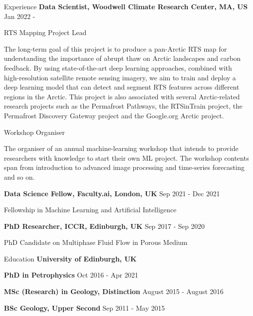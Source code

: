 \documentclass{resume} %
\newenvironment{indentpar}[1]%
  {\begin{list}{}%
          {\setlength{\leftmargin}{#1}}%
          \item[]%
  }
  {\end{list}}
\begin{document}
\begin{rSection}{Experience}
{\bf Data Scientist, Woodwell Climate Research Center, MA, US} \hfill {Jan 2022 - } 

\begin{indentpar} {0.5cm} RTS Mapping Project Lead
\end{indentpar}
\begin{indentpar} {1cm} 
The long-term goal of this project is to produce a pan-Arctic RTS map for understanding the importance of abrupt thaw on Arctic landscapes and carbon feedback. By using state-of-the-art deep learning approaches, combined with high-resolution satellite remote sensing imagery, we aim to train and deploy a deep learning model that can detect and segment RTS features across different regions in the Arctic. This project is also associated with several Arctic-related research projects such as the Permafrost Pathways, the RTSinTrain project, the Permafrost Discovery Gateway project and the Google.org Arctic project.
\end{indentpar}

\begin{indentpar} {0.5cm} Workshop Organiser
\end{indentpar}
\begin{indentpar} {1cm} 
The organiser of an annual machine-learning workshop that intends to provide researchers with knowledge to start their own ML project. The workshop contents span from introduction to advanced image processing and time-series forecasting and so on.
\end{indentpar}

{\bf Data Science Fellow, Faculty.ai, London, UK} \hfill {Sep 2021 - Dec 2021} 
\begin{indentpar}{0.5cm}
Fellowship in Machine Learning and Artificial Intelligence
\end{indentpar}

{\bf PhD Researcher, ICCR, Edinburgh, UK} \hfill {Sep 2017 - Sep 2020} 
\begin{indentpar}{0.5cm}
PhD Candidate on Multiphase Fluid Flow in Porous Medium
\end{indentpar}
\end{rSection}
\begin{rSection}{Education}
{\bf University of Edinburgh, UK} 

\begin{indentpar}{0.5cm}
\textbf{PhD in Petrophysics} \hfill {Oct 2016 - Apr 2021}

\textbf{MSc (Research) in Geology, Distinction} \hfill {August 2015 - August 2016}

\textbf{BSc Geology, Upper Second} \hfill {Sep 2011 - May 2015} 
\end{indentpar}

\end{rSection}
\end{document}

